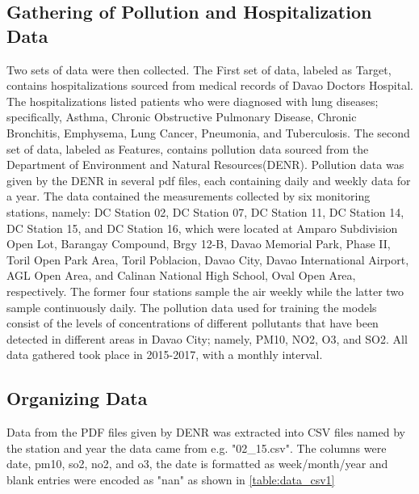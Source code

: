 \documentclass[10pt,11pt,12pt,oneside]{book}
\begin{document}
    \subsection{Gathering of Pollution and Hospitalization Data}
    Two sets of data were then collected. The First set of data, labeled as Target, contains hospitalizations sourced from medical records of Davao Doctors Hospital. The hospitalizations listed patients who were diagnosed with lung diseases; specifically, Asthma, Chronic Obstructive Pulmonary Disease, Chronic Bronchitis, Emphysema, Lung Cancer, Pneumonia, and Tuberculosis. The second set of data, labeled as Features, contains pollution data sourced from the Department of Environment and Natural
    Resources(DENR). Pollution data was given by the DENR in several pdf files, each containing daily and weekly data for a year. The data contained the measurements collected by six monitoring stations, namely: DC Station 02, DC Station 07, DC Station 11, DC Station 14, DC Station 15, and DC Station 16, which were located at Amparo Subdivision Open Lot, Barangay Compound, Brgy 12-B, Davao Memorial Park, Phase II, Toril Open Park Area, Toril Poblacion, Davao City, Davao International Airport, AGL Open
Area, and Calinan National High School, Oval Open Area, respectively. The former four stations sample the air weekly while the latter two sample continuously daily. The pollution data used for training the models consist of the levels of concentrations of different pollutants that have been detected in different areas in Davao City; namely, PM10, NO2, O3, and SO2. All data gathered took place in 2015-2017, with a monthly interval.
    \subsection{Organizing Data}
Data from the PDF files given by DENR was extracted into CSV files named by the station and year the data came from e.g. "02\_15.csv". The columns were date, pm10, so2, no2, and o3, the date is formatted as week/month/year and blank entries were encoded as "nan" as shown in \ref{table:data_csv1}
\end{document}
